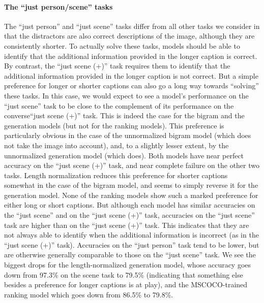 \documentclass[11pt]{article}
\begin{document}
\paragraph{The ``just person/scene'' tasks}
The ``just person'' and ``just scene'' tasks differ from all other tasks we consider in that the distractors are also correct descriptions of the image, although they are consistently shorter.  To actually solve these tasks, models should be able to identify that the additional information provided in the longer caption is correct.  By contrast, the ``just scene (+)'' task requires them to identify that the additional information provided in the longer caption is not correct. But a simple preference for longer or shorter captions can also go a long way towards ``solving'' these tasks. In this case, we would expect to see a model's performance on the ``just scene'' task to be close to the complement of its performance on the converse``just scene (+)'' task. This is indeed the case for the bigram and the generation models (but not for the ranking models).
This preference is particularly obvious in the case of the unnormalized bigram model (which does not take the image into account), and, to a slightly lesser extent, by the unnormalized generation model (which does). Both models have near perfect accuracy on the ``just scene (+)'' task, and near complete failure on the other two tasks.  Length normalization reduces this preference for shorter captions somewhat in the case of the bigram model, and seems to simply reverse it for the generation model. None of the ranking models show such a marked preference for either long or short captions. But although each model has similar accuracies on the ``just scene'' and on the ``just scene (+)'' task, accuracies on the ``just scene'' task are higher than on the ``just scene (+)'' task. This indicates that they are not always able to identify when the additional information is incorrect (as in the ``just scene (+)'' task). Accuracies on the ``just person'' task tend to be lower, but are otherwise generally comparable to those on the ``just scene'' task. We see the biggest drops for the length-normalized generation model, whose accuracy goes down from 97.3\% on the scene task to 79.5\% (indicating that something else besides a preference for longer captions is at play), and the MSCOCO-trained ranking model which goes down from 86.5\% to 79.8\%. 
\end{document}
